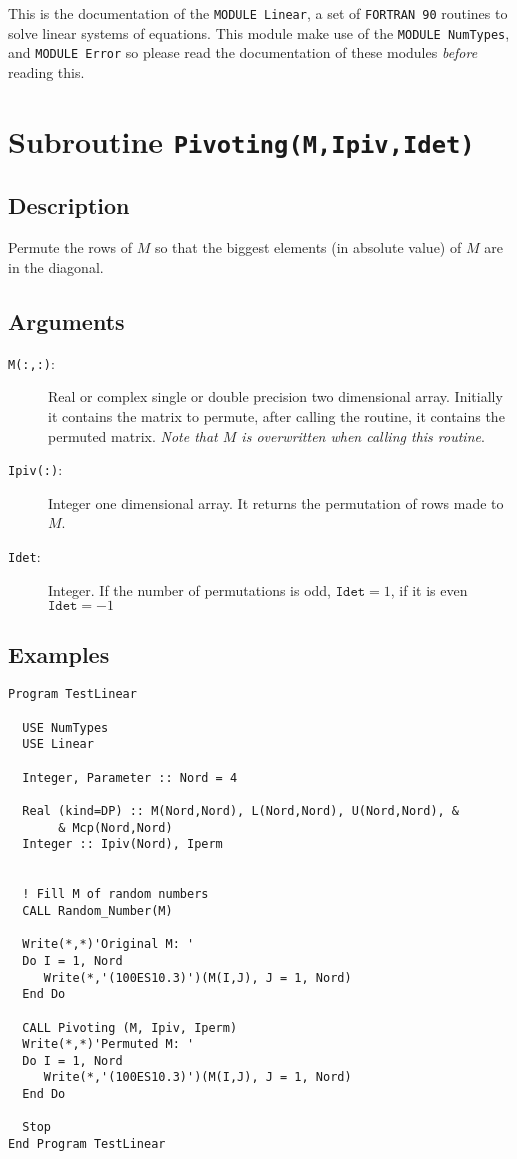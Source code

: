 This is the documentation of the \texttt{MODULE Linear}, a set
of \texttt{FORTRAN 90} routines to solve linear systems of
equations. This module make use of the \texttt{MODULE NumTypes},
and \texttt{MODULE Error} so please read the
documentation of these modules \emph{before} reading this.


\section{Subroutine \texttt{Pivoting(M,Ipiv,Idet)}}

\subsection{Description}

Permute the rows of $M$ so that the biggest elements (in absolute
value) of $M$ are in the diagonal.

\subsection{Arguments}

\begin{description}
\item[\texttt{M(:,:)}: ] Real or complex single or double precision
  two dimensional 
  array. Initially it contains the matrix to permute, after calling
  the routine, it contains the permuted matrix. \emph{Note that $M$ is
    overwritten when calling this routine}. 
\item[\texttt{Ipiv(:)}: ] Integer one dimensional array. It returns
  the permutation of rows made to $M$.
\item[\texttt{Idet}: ] Integer. If the number of permutations is odd,
  $\mathtt{Idet}=1$, if it is even $\mathtt{Idet}=-1$
\end{description}

\subsection{Examples}

\begin{lstlisting}[emph=Pivoting,
                   emphstyle=\color{blue},
                   frame=trBL,
                   caption=Pivoting data of a matrix
                   label=pivoting]
Program TestLinear

  USE NumTypes
  USE Linear

  Integer, Parameter :: Nord = 4

  Real (kind=DP) :: M(Nord,Nord), L(Nord,Nord), U(Nord,Nord), &
       & Mcp(Nord,Nord)
  Integer :: Ipiv(Nord), Iperm


  ! Fill M of random numbers
  CALL Random_Number(M)

  Write(*,*)'Original M: '
  Do I = 1, Nord
     Write(*,'(100ES10.3)')(M(I,J), J = 1, Nord)
  End Do

  CALL Pivoting (M, Ipiv, Iperm)
  Write(*,*)'Permuted M: '
  Do I = 1, Nord
     Write(*,'(100ES10.3)')(M(I,J), J = 1, Nord)
  End Do

  Stop
End Program TestLinear
\end{lstlisting}


